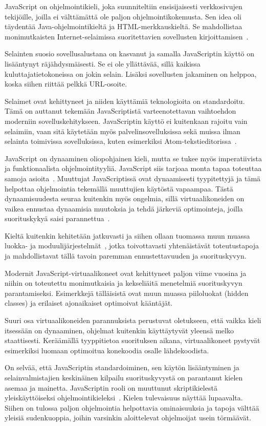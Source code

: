 \noindent
JavaScript on ohjelmointikieli, joka suunniteltiin ensisijaisesti verkkosivujen tekijöille, joilla ei välttämättä ole paljon ohjelmointikokemusta. Sen idea oli täydentää Java-ohjelmointikieltä ja HTML-merkkauskieltä. Se mahdollistaa monimutkaisten Internet-selaimissa suoritettavien sovellusten kirjoittamisen~\cite{paolini1994netscape}.

Selainten suosio sovellusalustana on kasvanut ja samalla JavaScriptin käyttö on lisääntynyt räjähdysmäisesti. Se ei ole yllättävää, sillä kaikissa kuluttajatietokoneissa on jokin selain. Lisäksi sovellusten jakaminen on helppoa, koska siihen riittää pelkkä URL-osoite.

Selaimet ovat kehittyneet ja niiden käyttämiä teknologioita on standardoitu. Tämä on auttanut tekemään JavaScriptistä varteenotettavan vaihtoehdon moderniin sovelluskehitykseen. JavaScriptin käyttö ei kuitenkaan rajoitu vain selaimiin, vaan sitä käytetään myös palvelinsovelluksissa sekä muissa ilman selainta toimivissa sovelluksissa, kuten esimerkiksi Atom-tekstieditorissa~\cite{atom}.

JavaScript on dynaaminen oliopohjainen kieli, mutta se tukee myös imperatiivista ja funktionaalista ohjelmointityyliä. JavaScript siis tarjoaa monta tapaa toteuttaa samoja asioita~\cite[Osio 4.2.1.]{es6}. Muuttujat JavaScriptissä ovat dynaamisesti tyypitettyjä ja tämä helpottaa ohjelmointia tekemällä muuttujien käytöstä vapaampaa. Tästä dynaamisuudesta seuraa kuitenkin myös ongelmia, sillä virtuaalikoneiden on vaikea ennustaa dynaamisia muutoksia ja tehdä järkeviä optimointeja, joilla suorituskykyä saisi parannettua~\cite{Ahn2014}.

Kieltä kuitenkin kehitetään jatkuvasti ja siihen ollaan tuomassa muun muassa luokka- ja moduulijärjestelmät~\cite[Osiot~14.5.~ja~15.2.]{es6}, jotka toivottavasti yhtenäistävät toteutustapoja ja mahdollistavat tällä tavoin paremman ennustettavuuden ja suorituskyvyn.

Modernit JavaScript-virtuaalikoneet ovat kehittyneet paljon viime vuosina ja niihin on toteutettu monimutkaisia ja kekseliäitä menetelmiä suorituskyvyn parantamiseksi. Esimerkkejä tälläisistä ovat muun muassa piiloluokat (hidden classes) ja erilaiset ajonaikaiset optimoivat kääntäjät.

Suuri osa virtuaalikoneiden parannuksista perustuvat oletukseen, että vaikka kieli itsessään on dynaaminen, ohjelmat kuitenkin käyttäytyvät yleensä melko staattisesti. Keräämällä tyyppitietoa suorituksen aikana, virtuaalikoneet pystyvät esimerkiksi luomaan optimoitua konekoodia osalle lähdekoodista.

On selvää, että JavaScriptin standardoiminen, sen käytön lisääntyminen ja selainvalmistajien keskinäinen kilpailu suorituskyvystä on parantanut kielen asemaa ja mainetta. JavaScriptin rooli on muuttunut skriptikielestä yleiskäyttöiseksi ohjelmointikieleksi~\cite[Osio~4.]{es6}. Kielen tulevaisuus näyttää lupaavalta. Siihen on tulossa paljon ohjelmointia helpottavia ominaisuuksia ja tapoja välttää yleisiä sudenkuoppia, joihin varsinkin aloittelevat ohjelmoijat usein törmäävät.